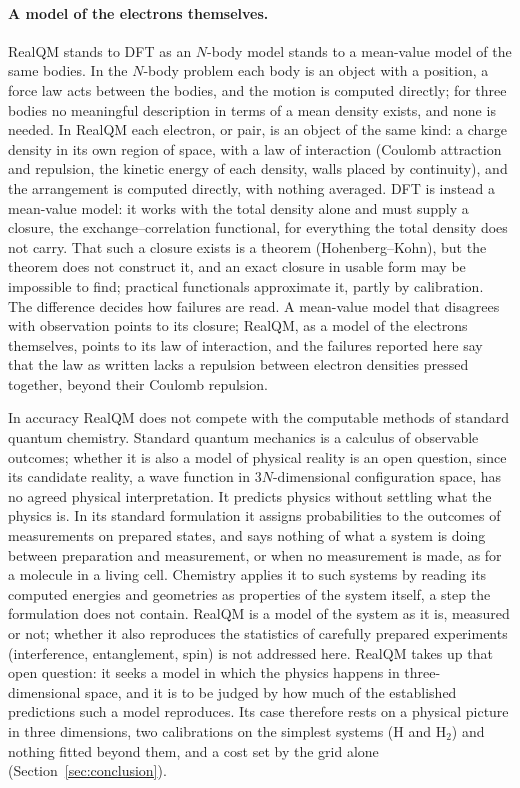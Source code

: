 \documentclass[11pt]{article}
\begin{document}
\paragraph{A model of the electrons themselves.} RealQM stands to DFT as an $N$-body model stands to a mean-value model
of the same bodies. In the $N$-body problem each body is an object with a position, a force law acts between the
bodies, and the motion is computed directly; for three bodies no meaningful description in terms of a mean density
exists, and none is needed. In RealQM each electron, or pair, is an object of the same kind: a charge density in its
own region of space, with a law of interaction (Coulomb attraction and repulsion, the kinetic energy of each density,
walls placed by continuity), and the arrangement is computed directly, with nothing averaged. DFT is instead a
mean-value model: it works with the total density alone and must supply a closure, the exchange--correlation
functional, for everything the total density does not carry. That such a closure exists is a theorem
(Hohenberg--Kohn), but the theorem does not construct it, and an exact closure in usable form may be impossible to
find; practical functionals approximate it, partly by calibration. The difference decides how failures are read. A
mean-value model that disagrees with observation points to its closure; RealQM, as a model of the electrons
themselves, points to its law of interaction, and the failures reported here say that the law as written lacks a
repulsion between electron densities pressed together, beyond their Coulomb repulsion.

In accuracy RealQM does not compete with the computable methods of standard quantum chemistry. Standard quantum mechanics is a calculus of
observable outcomes; whether it is also a model of physical reality is an open question, since its candidate
reality, a wave function in $3N$-dimensional configuration space, has no agreed physical interpretation. It
predicts physics without settling what the physics is. In its standard formulation it assigns probabilities to the
outcomes of measurements on prepared states, and says nothing of what a system is doing between preparation and
measurement, or when no measurement is made, as for a molecule in a living cell. Chemistry applies it to such systems by
reading its computed energies and geometries as properties of the system itself, a step the formulation does not
contain. RealQM is a model of the system as it is, measured or not; whether it also reproduces the statistics of
carefully prepared experiments (interference, entanglement, spin) is not addressed here. RealQM takes up that open question: it seeks a model in
which the physics happens in three-dimensional space, and it is to be judged by how much of the established
predictions such a model reproduces. Its case therefore rests on a physical picture in three dimensions,
two calibrations on the simplest systems (H and H$_2$) and nothing fitted beyond them, and a cost set by the
grid alone (Section~\ref{sec:conclusion}).
\end{document}
